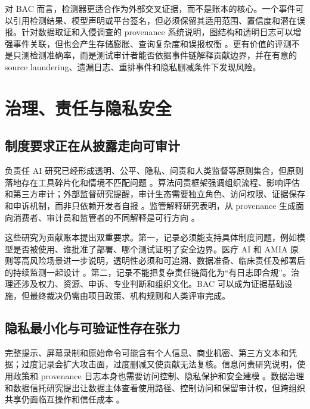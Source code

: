 \documentclass[UTF8,a4paper,12pt]{ctexart}
\begin{document}
对 BAC 而言，检测器更适合作为外部交叉证据，而不是账本的核心。一个事件可以引用检测结果、模型声明或平台签名，但必须保留其适用范围、置信度和潜在误报。针对数据取证和入侵调查的 provenance 系统说明，图结构和透明日志可以增强事件关联，但也会产生存储膨胀、查询复杂度和误报权衡 \cite{forensiblockaprovenance2023,provenancebasedintrusion2022,omegaloghighfidelity2020}。更有价值的评测不是只测检测准确率，而是测试审计者能否依据事件链解释贡献边界，并在有意的 source laundering、遗漏日志、重排事件和隐私删减条件下发现风险。

\section{治理、责任与隐私安全}
\subsection{制度要求正在从披露走向可审计}
负责任 AI 研究已经形成透明、公平、隐私、问责和人类监督等原则集合，但原则落地存在工具碎片化和情境不匹配问题 \cite{connectingthedots2023,puttingaiethics2021,aiethicsintegrating2025}。算法问责框架强调组织流程、影响评估和第三方审计；外部监督研究提醒，审计生态需要独立角色、访问权限、证据保存和申诉机制，而非只依赖开发者自报 \cite{agovernanceframework2019,outsideroversightdesigning2022}。监管解释研究表明，从 provenance 生成面向消费者、审计员和监管者的不同解释是可行方向 \cite{addressingregulatoryrequirements2020}。

这些研究为贡献账本提出双重要求。第一，记录必须能支持具体制度问题，例如模型是否被使用、谁批准了部署、哪个测试证明了安全边界。医疗 AI 和 AMIA 原则等高风险场景进一步说明，透明性必须和可追溯、数据准备、临床责任及部署后的持续监测一起设计 \cite{anauditableand2026,definingamias2021}。第二，记录不能把复杂责任链简化为“有日志即合规”。治理还涉及权力、资源、申诉、专业判断和组织文化。BAC 可以成为证据基础设施，但最终裁决仍需由项目政策、机构规则和人类评审完成。

\subsection{隐私最小化与可验证性存在张力}
完整提示、屏幕录制和原始命令可能含有个人信息、商业机密、第三方文本和凭据；过度记录会扩大攻击面，过度删减又使贡献无法复核。信息问责研究说明，使用政策和 provenance 日志本身也需要访问控制、隐私保护和安全建模 \cite{thesecurityand2015}。数据治理和数据信托研究提出让数据主体查看使用路径、控制访问和保留审计权，但跨组织共享仍面临互操作和信任成本 \cite{datatrustsas2022,establishingethicalframeworks2025}。
\end{document}
